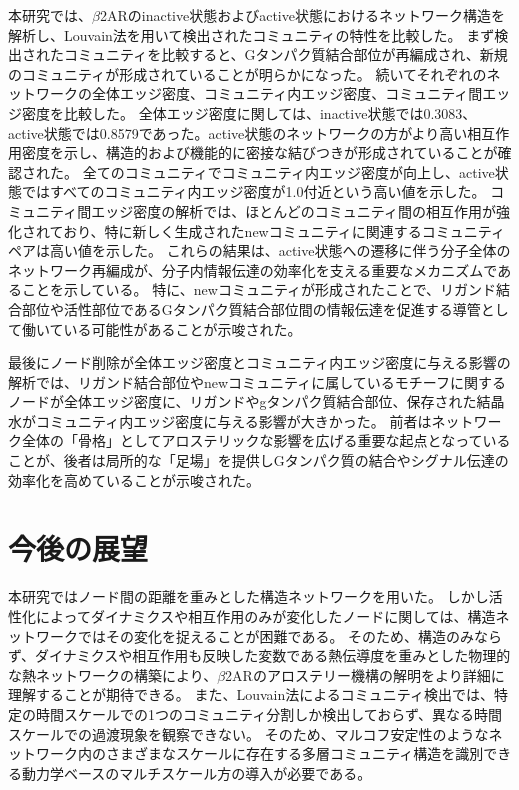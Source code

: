 本研究では、$\beta$2ARのinactive状態およびactive状態におけるネットワーク構造を解析し、Louvain法を用いて検出されたコミュニティの特性を比較した。
まず検出されたコミュニティを比較すると、Gタンパク質結合部位が再編成され、新規のコミュニティが形成されていることが明らかになった。
続いてそれぞれのネットワークの全体エッジ密度、コミュニティ内エッジ密度、コミュニティ間エッジ密度を比較した。
全体エッジ密度に関しては、inactive状態では0.3083、active状態では0.8579であった。active状態のネットワークの方がより高い相互作用密度を示し、構造的および機能的に密接な結びつきが形成されていることが確認された。
全てのコミュニティでコミュニティ内エッジ密度が向上し、active状態ではすべてのコミュニティ内エッジ密度が1.0付近という高い値を示した。
コミュニティ間エッジ密度の解析では、ほとんどのコミュニティ間の相互作用が強化されており、特に新しく生成されたnewコミュニティに関連するコミュニティペアは高い値を示した。
これらの結果は、active状態への遷移に伴う分子全体のネットワーク再編成が、分子内情報伝達の効率化を支える重要なメカニズムであることを示している。
特に、newコミュニティが形成されたことで、リガンド結合部位や活性部位であるGタンパク質結合部位間の情報伝達を促進する導管として働いている可能性があることが示唆された。

最後にノード削除が全体エッジ密度とコミュニティ内エッジ密度に与える影響の解析では、リガンド結合部位やnewコミュニティに属しているモチーフに関するノードが全体エッジ密度に、リガンドやgタンパク質結合部位、保存された結晶水がコミュニティ内エッジ密度に与える影響が大きかった。
前者はネットワーク全体の「骨格」としてアロステリックな影響を広げる重要な起点となっていることが、後者は局所的な「足場」を提供しGタンパク質の結合やシグナル伝達の効率化を高めていることが示唆された。

\section{今後の展望}
本研究ではノード間の距離を重みとした構造ネットワークを用いた。
しかし活性化によってダイナミクスや相互作用のみが変化したノードに関しては、構造ネットワークではその変化を捉えることが困難である。
そのため、構造のみならず、ダイナミクスや相互作用も反映した変数である熱伝導度\cite{yamato2022computational}を重みとした物理的な熱ネットワークの構築により、$\beta$2ARのアロステリー機構の解明をより詳細に理解することが期待できる。
また、Louvain法によるコミュニティ検出では、特定の時間スケールでの1つのコミュニティ分割しか検出しておらず、異なる時間スケールでの過渡現象を観察できない。
そのため、マルコフ安定性\cite{amor2014uncovering}のようなネットワーク内のさまざまなスケールに存在する多層コミュニティ構造を識別できる動力学ベースのマルチスケール方の導入が必要である。
